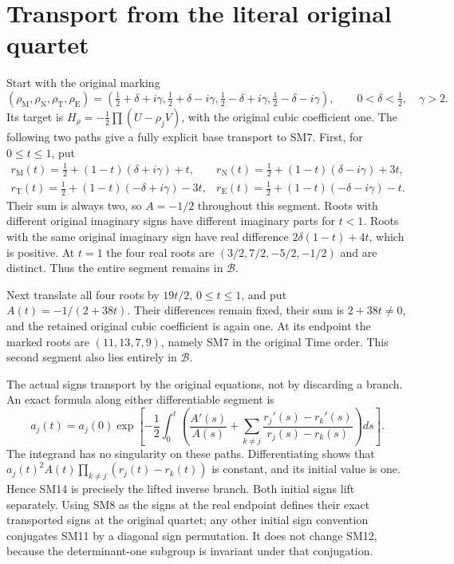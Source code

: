 \documentclass[11pt]{article}
\begin{document}
\section{Transport from the literal original quartet}
Start with the original marking
\[
 (\rho_{\mathrm M},\rho_{\mathrm N},\rho_{\mathrm T},\rho_{\mathrm E})
 =\left(\tfrac12+\delta+i\gamma,\tfrac12+\delta-i\gamma,
        \tfrac12-\delta+i\gamma,\tfrac12-\delta-i\gamma\right),
 \qquad0<\delta<\tfrac12,\quad\gamma>2.
\]
Its target is $H_\rho=-\frac12\prod(U-\rho_jV)$, with the
original cubic coefficient one. The following two paths give a
fully explicit base transport to SM7. First, for $0\le t\le1$,
put
\begin{equation}
 \begin{array}{ll}
 r_{\mathrm M}(t)=\tfrac12+(1-t)(\delta+i\gamma)+t,
 &r_{\mathrm N}(t)=\tfrac12+(1-t)(\delta-i\gamma)+3t,\\
 r_{\mathrm T}(t)=\tfrac12+(1-t)(-\delta+i\gamma)-3t,
 &r_{\mathrm E}(t)=\tfrac12+(1-t)(-\delta-i\gamma)-t.
 \end{array}\tag{SM13}
\end{equation}
Their sum is always two, so $A=-1/2$ throughout this segment.
Roots with different original imaginary signs have different
imaginary parts for $t<1$. Roots with the same original imaginary
sign have real difference $2\delta(1-t)+4t$, which is positive.
At $t=1$ the four real roots are $(3/2,7/2,-5/2,-1/2)$ and
are distinct. Thus the entire segment remains in $\mathcal B$.

Next translate all four roots by $19t/2$, $0\le t\le1$, and
put $A(t)=-1/(2+38t)$. Their differences remain fixed, their sum
is $2+38t\ne0$, and the retained original cubic coefficient is
again one. At its endpoint the marked roots are
$(11,13,7,9)$, namely SM7 in the original Time order. This
second segment also lies entirely in $\mathcal B$.

The actual signs transport by the original equations, not by
discarding a branch. An exact formula along either differentiable
segment is
\begin{equation}
 a_j(t)=a_j(0)\exp\left[-\frac12\int_0^t
 \left(\frac{A'(s)}{A(s)}+
 \sum_{k\ne j}\frac{r_j'(s)-r_k'(s)}{r_j(s)-r_k(s)}\right)ds\right].
 \tag{SM14}
\end{equation}
The integrand has no singularity on these paths. Differentiating
shows that $a_j(t)^2A(t)\prod_{k\ne j}(r_j(t)-r_k(t))$ is
constant, and its initial value is one. Hence SM14 is precisely
the lifted inverse branch. Both initial signs lift separately.
Using SM8 as the signs at the real endpoint defines their exact
transported signs at the original quartet; any other initial
sign convention conjugates SM11 by a diagonal sign permutation.
It does not change SM12, because the determinant-one subgroup
is invariant under that conjugation.
\end{document}
